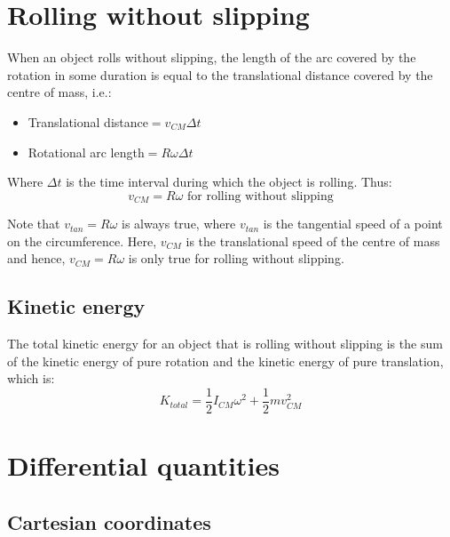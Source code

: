 \documentclass[11pt]{article}
\begin{document}
\newpage
\section{Rolling without slipping}
\label{sec:org156c8d1}
When an object rolls without slipping, the length of the arc covered by the rotation in some duration is equal to the translational distance covered by the centre of mass, i.e.:
\begin{itemize}
\item Translational distance\(= v_{CM} \Delta t\)
\item Rotational arc length\(= R \omega \Delta t\)
\end{itemize}

Where \(\Delta t\) is the time interval during which the object is rolling. Thus:
\[v_{CM} = R \omega \text{ for rolling without slipping}\]

Note that \(v_{tan} = R \omega\) is always true, where \(v_{tan}\) is the tangential speed of a point on the circumference. Here, \(v_{CM}\) is the translational speed of the centre of mass and hence, \(v_{CM} = R \omega\) is only true for rolling without slipping.
\subsection{Kinetic energy}
\label{sec:orgbab88ca}

The total kinetic energy for an object that is rolling without slipping is the sum of the kinetic energy of pure rotation and the kinetic energy of pure translation, which is:
\[K_{total} = \frac{1}{2} I_{CM} \omega^2 + \frac{1}{2} mv_{CM}^2\]
\section{Differential quantities}
\label{sec:orgcddca3c}

\subsection{Cartesian coordinates}
\label{sec:org2c11c3a}
\end{document}
